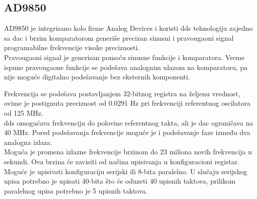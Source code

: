 \subsection{AD9850}

AD9850 je integrisano kolo firme Analog Devices i koristi \gls{dds} tehnologiju
zajedno sa \gls{dac} i brzim komparatorom generiše precizan sinusni i
pravougaoni signal programabilne frekvencije visoke preciznosti. \\
Pravougaoni signal je generisan pomoću sinusne funkcije i komparatora.
Vreme ispune pravougaone funkcije se podešava analognim ulazom na komparatoru,
pa nije moguće digitalno podešavanje bez eksternih komponenti. \\

\begin{figure}[H]
\end{figure}

Frekvencija se podešava postavljanjem 32-bitnog registra na željenu vrednost,
ovime je postignuta preciznost od 0.0291 Hz pri frekvenciji referentnog oscilatora od 125
MHz. \\
\gls{dds} omogućava frekvenciju do polovine referentnog takta, ali je \gls{dac}
ograničava na 40 MHz.
Pored podešavanja frekvencije moguće je i podešavanje faze između dva analogna
izlaza. \\

Moguća je promena izlazne frekvencije brzinom do 23 miliona
novih frekvencija u sekundi.
Ova brzina će zavisiti od načina upisivanja u konfiguracioni registar.
Moguće je upisivati konfiguraciju serijski ili 8-bita paralelno.
U slučaju serijskog upisa potrebno je upisati 40-bita što će oduzeti 40 upisnih
taktova, prilikom paralelnog upisa potrebno je 5 upisnih taktova. \\

